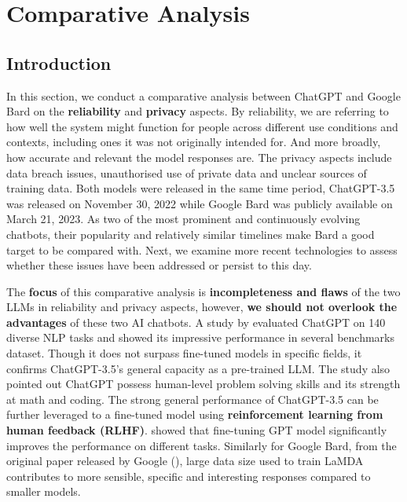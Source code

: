 \newpage
\section{Comparative Analysis}

\subsection{Introduction}

In this section, we conduct a comparative analysis between ChatGPT and Google Bard on the \textbf{reliability} and \textbf{privacy} aspects. By reliability, we are referring to how well the system might function for people across different use conditions and contexts, including ones it was not originally intended for. And more broadly, how accurate and relevant the model responses are. The privacy aspects include data breach issues, unauthorised use of private data and unclear sources of training data. Both models were released in the same time period, ChatGPT-3.5 was released on November 30, 2022 while Google Bard was publicly available on March 21, 2023. As two of the most prominent and continuously evolving chatbots, their popularity and relatively similar timelines make Bard a good target to be compared with. Next, we examine more recent technologies to assess whether these issues have been addressed or persist to this day.

The \textbf{focus} of this comparative analysis is \textbf{incompleteness and flaws} of the two LLMs in reliability and privacy aspects, however, \textbf{we should not overlook the advantages} of these two AI chatbots. A study by \cite{laskar2023systematic} evaluated ChatGPT on 140 diverse NLP tasks and showed its impressive performance in several benchmarks dataset. Though it does not surpass fine-tuned models in specific fields, it confirms ChatGPT-3.5's general capacity as a pre-trained LLM. The study also pointed out ChatGPT possess human-level problem solving skills and its strength at math and coding. The strong general performance of ChatGPT-3.5 can be further leveraged to a fine-tuned model using \textbf{reinforcement learning from human feedback (RLHF)}. \cite{ouyang2022training} showed that fine-tuning GPT model significantly improves the performance on different tasks. Similarly for Google Bard, from the original paper released by Google (\cite{thoppilan2022lamda}), large data size used to train LaMDA contributes to more sensible, specific and interesting responses compared to smaller models.


